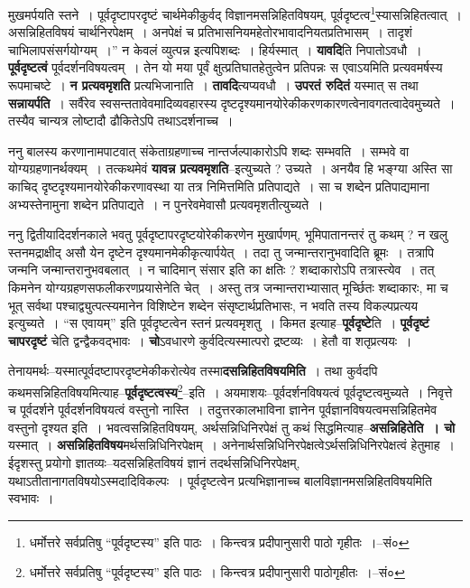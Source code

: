 \documentclass[article,12pt,a4paper]{memoir}
\begin{document}
	मुखमर्पयति स्तने । पूर्वदृष्टापरदृष्टं चार्थमेकीकुर्वद् विज्ञानमसन्निहितविषयम्, पूर्वदृष्टत्व\footnote{धर्मोत्तरे सर्वप्रतिषु “पूर्वदृष्टस्य” इति पाठः । किन्त्वत्र प्रदीपानुसारी पाठो गृहीतः ।--सं०}\-स्यासन्निहितत्वात् । असन्निहितविषयं चार्थनिरपेक्षम् । अनपेक्षं च प्रतिभासनियमहेतोरभावादनियतप्रतिभासम् । तादृशं चाभिलापसंसर्गयोग्यम् ।” न केवलं व्युत्पन्न इत्यपिशब्दः । हिर्यस्मात् । \textbf{यावदि}ति निपातोऽवधौ । \textbf{पूर्वदृष्टत्वं} पूर्वदर्शनविषयत्वम् । तेन यो मया पूर्वं क्षुत्प्रतिघातहेतुत्वेन प्रतिपन्नः स एवाऽयमिति प्रत्यवमर्षस्य रूपमाचष्टे । \textbf{न प्रत्यवमृशति} प्रत्यभिजानाति । \textbf{तावदि}त्यप्यवधौ । \textbf{उपरतं रुदितं} यस्मात् स तथा \textbf{सन्नायर्पति} । सर्वैरेव स्वसन्ततावेवमादिव्यवहारस्य दृष्टदृश्यमानयोरेकीकरणकारणत्वेनावगतत्वादेवमुच्यते । तस्यैव चान्यत्र लोष्टादौ ढौकितेऽपि तथाऽदर्शनाच्च ।
	\pend
      

	  \pstart ननु बालस्य करणानामपाटवात् संकेताग्रहणाच्च नान्तर्जल्पाकारोऽपि शब्दः सम्भवति । सम्भवे वा योग्यग्रहणानर्थक्यम् । तत्कथमेवं \textbf{यावन्न प्रत्यवमृशति}--इत्युच्यते ? उच्यते । अनयैव हि भङ्ग्या अस्ति सा काचिद् दृष्टदृश्यमानयोरेकीकरणावस्था या तत्र निमित्तमिति प्रतिपाद्यते । सा च शब्देन प्रतिपाद्यमाना अभ्यस्तेनामुना शब्देन प्रतिपाद्यते । न पुनरेवमेवासौ प्रत्यवमृशतीत्युच्यते ।
	\pend
      

	  \pstart ननु द्वितीयादिदर्शनकाले भवतु पूर्वदृष्टापरदृष्टयोरेकीकरणेन मुखार्पणम्, भूमिपातानन्तरं तु कथम् ? न खलु स्तनमद्राक्षीद् असौ येन दृष्टेन दृश्यमानमेकीकृत्यार्पयेत् । तदा तु जन्मान्तरानुभवादिति ब्रूमः । तत्रापि जन्मनि जन्मान्तरानुभवबलात् । न चादिमान् संसार इति का क्षतिः ? शब्दाकारोऽपि तत्रास्त्येव । तत् किमनेन योग्यग्रहणसफलीकरणप्रयासेनेति चेत् । अस्तु तत्र जन्मान्तराभ्यासात् मूर्च्छितः शब्दाकारः, मा च भूत् सर्वथा पश्चाद्व्युत्पत्स्यमानेन विशिष्टेन शब्देन संसृष्टार्थप्रतिभासः, न भवति तस्य विकल्पप्रत्यय इत्युच्यते । “स एवायम्” इति पूर्वदृष्टत्वेन स्तनं प्रत्यवमृशतु । किमत इत्याह--\textbf{पूर्वदृष्टे}ति । \textbf{पूर्वदृष्टं चापरदृष्टं} चेति द्वन्द्वैकवद्भावः । \textbf{चो}ऽवधारणे कुर्वदित्यस्मात्परो द्रष्टव्यः । हेतौ वा शतृप्रत्ययः ।
	\pend
      

	  \pstart तेनायमर्थः--यस्मात्पूर्वदष्टापरदृष्टमेकीकरोत्येव तस्मा\textbf{दसन्निहितविषयमिति} । तथा कुर्वदपि कथमसन्निहितविषयमित्याह--\textbf{पूर्वदृष्टत्वस्य}\footnote{धर्मोत्तरे सर्वप्रतिषु “पूर्वदृष्टस्य” इति पाठः । किन्त्वत्र प्रदीपानुसारी पाठोगृहीतः ।--सं०}\---इति । अयमाशयः--पूर्वदर्शनविषयत्वं पूर्वदृष्टत्वमुच्यते । निवृत्ते च पूर्वदर्शने पूर्वदर्शनविषयत्वं वस्तुनो नास्ति । तदुत्तरकालभाविना ज्ञानेन पूर्वज्ञानविष\leavevmode{}यत्वमसन्निहितमेव वस्तुनो दृश्यत इति । भवत्वसन्निहितविषयम्, अर्थसन्निधिनिरपेक्षं तु कथं सिद्धमित्याह--\textbf{असन्निहितेति । चो} यस्मात् । \textbf{असन्निहितविषय}मर्थसन्निधिनिरपेक्षम् । अनेनार्थसन्निधिनिरपेक्षत्वेऽर्थसन्निधिनिरपेक्षत्वं हेतुमाह । ईदृशस्तु प्रयोगो ज्ञातव्यः--यदसन्निहितविषयं ज्ञानं तदर्थसन्निधिनिरपेक्षम्, यथाऽतीतानागतविषयोऽस्मदादिविकल्पः । पूर्वदृष्टत्वेन प्रत्यभिज्ञानाच्च बालविज्ञानमसन्निहितविषयमिति स्वभावः ।
	\pend
      
\end{document}
